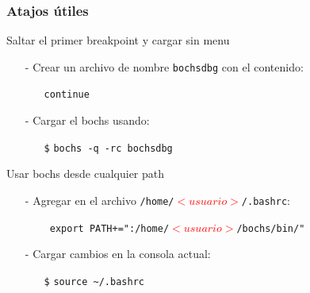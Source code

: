 \documentclass[aspectratio=169]{beamer}
\begin{document}
\begin{frame}
    \frametitle{Atajos útiles}
    \textcolor{naranjauca}{Saltar el primer breakpoint y cargar sin menu}\\
    \begin{itemize}
    \item[-] Crear un archivo de nombre \texttt{bochsdbg} con el contenido:
    \begin{itemize}
        \item[] \small \texttt{continue}
    \end{itemize}
    \vspace{0.2cm}
    \item[-] Cargar el bochs usando:
    \begin{itemize}
        \item[\texttt{\$}] \small \texttt{bochs -q -rc bochsdbg}
    \end{itemize}
    \end{itemize}
    \vspace{0.4cm}
    \pause
    \textcolor{naranjauca}{Usar bochs desde cualquier path}\\
    \begin{itemize}
    \item[-] Agregar en el archivo \texttt{/home/\textcolor{red}{$<usuario>$}/.bashrc}:
    \begin{itemize}
        \item[] \small \texttt{ export PATH+=":/home/\textcolor{red}{$<usuario>$}/bochs/bin/" }
    \end{itemize}
    \vspace{0.2cm}
    \item[-] Cargar cambios en la consola actual:
    \begin{itemize}
        \item[\texttt{\$}] \small \texttt{source \textasciitilde/.bashrc }
    \end{itemize}
    \end{itemize}
\end{frame}
\end{document}
